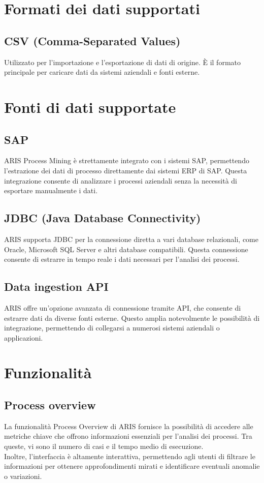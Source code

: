 \documentclass{article}
\begin{document}
\section{Formati dei dati supportati}

\subsection{CSV (Comma-Separated Values)}
Utilizzato per l'importazione e l'esportazione di dati di origine. È il formato principale per caricare dati da sistemi aziendali e fonti esterne.

\section{Fonti di dati supportate}
\subsection{SAP}
ARIS Process Mining è strettamente integrato con i sistemi SAP, permettendo l'estrazione dei dati di processo direttamente dai sistemi ERP di SAP. Questa integrazione consente di analizzare i processi aziendali senza la necessità di esportare manualmente i dati.
\subsection{JDBC (Java Database Connectivity)}
ARIS supporta JDBC per la connessione diretta a vari database relazionali, come Oracle, Microsoft SQL Server e altri database compatibili. Questa connessione consente di estrarre in tempo reale i dati necessari per l'analisi dei processi.
\subsection{Data ingestion API}
ARIS offre un'opzione avanzata di connessione tramite API, che consente di estrarre dati da diverse fonti esterne. Questo amplia notevolmente le possibilità di integrazione, permettendo di collegarsi a numerosi sistemi aziendali o applicazioni.

\section{Funzionalità}
\subsection{Process overview}
La funzionalità Process Overview di ARIS fornisce la possibilità di accedere alle metriche chiave che offrono informazioni essenziali per l'analisi dei processi. Tra queste, vi sono il numero di casi e il tempo medio di esecuzione.\\
Inoltre, l'interfaccia è altamente interattiva, permettendo agli utenti di filtrare le informazioni per ottenere approfondimenti mirati e identificare eventuali anomalie o variazioni.
\end{document}
